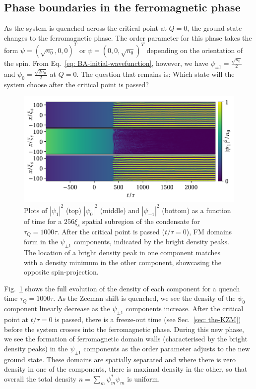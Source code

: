 \subsection{Phase boundaries in the ferromagnetic phase}
As the system is quenched across the critical point at \( Q = 0 \), the ground
state changes to the ferromagnetic phase.
The order parameter for this phase takes the form \(\psi={(\sqrt{n_0},0,0)}^T\)
or \(\psi={(0,0,\sqrt{n_0})}^T\) depending on the orientation of the spin.
From Eq.~\eqref{eq: BA-initial-wavefunction}, however, we have
\(\psi_{\pm 1} = \frac{\sqrt{n_0}}{2}\) and \(\psi_0 = \frac{\sqrt{2n_0}}{2}\)
at \( Q = 0 \).
The question that remains is: Which state will the system choose after
the critical point is passed?

\begin{figure}[tb]
    \centering
    \includegraphics[width=\textwidth]{gfx/ch-spin1/BA-FM_all_densities.pdf}
    \caption[Component densities of the system as a function of time]
    {\label{fig: BA-FM-densities}
    Plots of \(|\psi_1|^2\) (top) \(|\psi_0|^2\) (middle) and
        \(|\psi_{-1}|^2\) (bottom) as a function of time for a \(256\xi_s\)
        spatial subregion of the condensate for
        \( \tau_Q=1000\tau \).
        After the critical point is passed (\(t/\tau=0\)), FM domains form in
        the \(\psi_{\pm 1}\) components, indicated by the bright density peaks.
        The location of a bright density peak in one component matches with a
        density minimum in the other component, showcasing the opposite
        spin-projection.}
\end{figure}
Fig.~\ref{fig: BA-FM-densities} shows the full evolution of the density of each
component for a quench time \( \tau_Q=1000\tau \).
As the Zeeman shift is quenched, we see the density of the \(\psi_0\) component
linearly decrease as the \(\psi_{\pm 1}\) components increase.
After the critical point at \(t/\tau=0\) is passed, there is a freeze-out time
(see Sec.~\ref{sec: the-KZM}) before the system crosses into the ferromagnetic
phase.
During this new phase, we see the formation of ferromagnetic domain walls
(characterised by the bright density peaks) in the \(\psi_{\pm 1}\) components
as the order parameter adjusts to the new ground state.
These domains are spatially separated and where there is zero density in one of
the components, there is maximal density in the other, so that overall the total
density \(n=\sum_m\psi_m^*\psi_m\) is uniform.

